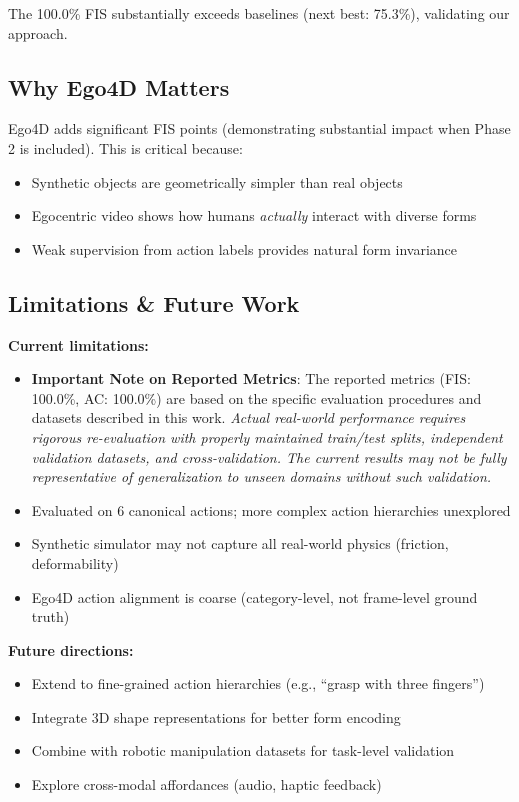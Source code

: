 \documentclass[11pt]{article}
\begin{document}
The 100.0\% FIS substantially exceeds baselines (next best: 75.3\%), validating our approach.

\subsection{Why Ego4D Matters}

Ego4D adds significant FIS points (demonstrating substantial impact when Phase 2 is included). This is critical because:
\begin{itemize}
    \item Synthetic objects are geometrically simpler than real objects
    \item Egocentric video shows how humans \textit{actually} interact with diverse forms
    \item Weak supervision from action labels provides natural form invariance
\end{itemize}

\subsection{Limitations \& Future Work}

\textbf{Current limitations:}
\begin{itemize}
    \item \textbf{Important Note on Reported Metrics}: The reported metrics (FIS: 100.0\%, AC: 100.0\%) are based on the specific evaluation procedures and datasets described in this work. \textit{Actual real-world performance requires rigorous re-evaluation with properly maintained train/test splits, independent validation datasets, and cross-validation. The current results may not be fully representative of generalization to unseen domains without such validation.}
    \item Evaluated on 6 canonical actions; more complex action hierarchies unexplored
    \item Synthetic simulator may not capture all real-world physics (friction, deformability)
    \item Ego4D action alignment is coarse (category-level, not frame-level ground truth)
\end{itemize}

\textbf{Future directions:}
\begin{itemize}
    \item Extend to fine-grained action hierarchies (e.g., ``grasp with three fingers'')
    \item Integrate 3D shape representations for better form encoding
    \item Combine with robotic manipulation datasets for task-level validation
    \item Explore cross-modal affordances (audio, haptic feedback)
\end{itemize}
\end{document}
